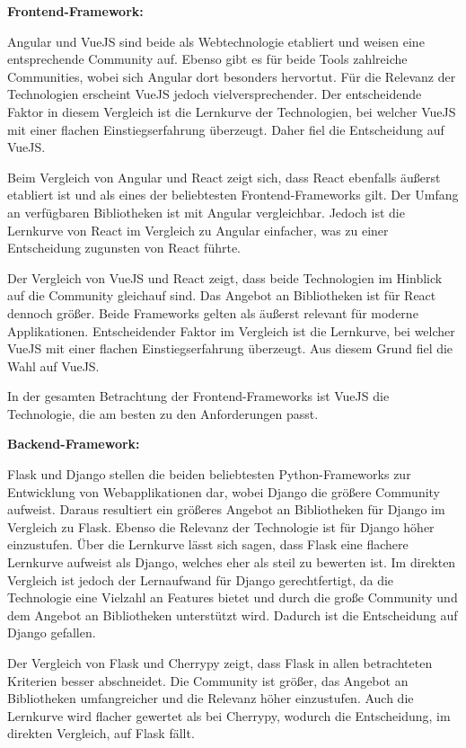 \textbf{Frontend-Framework:}

Angular und VueJS sind beide als Webtechnologie etabliert und weisen eine entsprechende Community auf.
Ebenso gibt es für beide Tools zahlreiche Communities, wobei sich Angular dort besonders hervortut.
Für die Relevanz der Technologien erscheint VueJS jedoch vielversprechender.
Der entscheidende Faktor in diesem Vergleich ist die Lernkurve der Technologien, bei welcher VueJS mit einer flachen Einstiegserfahrung überzeugt.
Daher fiel die Entscheidung auf VueJS.

Beim Vergleich von Angular und React zeigt sich, dass React ebenfalls äußerst etabliert ist und als eines der beliebtesten Frontend-Frameworks gilt.
Der Umfang an verfügbaren Bibliotheken ist mit Angular vergleichbar.
Jedoch ist die Lernkurve von React im Vergleich zu Angular einfacher, was zu einer Entscheidung zugunsten von React führte.

Der Vergleich von VueJS und React zeigt, dass beide Technologien im Hinblick auf die Community gleichauf sind.
Das Angebot an Bibliotheken ist für React dennoch größer.
Beide Frameworks gelten als äußerst relevant für moderne Applikationen.
Entscheidender Faktor im Vergleich ist die Lernkurve, bei welcher VueJS mit einer flachen Einstiegserfahrung überzeugt.
Aus diesem Grund fiel die Wahl auf VueJS.

In der gesamten Betrachtung der Frontend-Frameworks ist VueJS die Technologie, die am besten zu den Anforderungen passt.

\textbf{Backend-Framework:}

Flask und Django stellen die beiden beliebtesten Python-Frameworks zur Entwicklung von Webapplikationen dar, wobei Django die größere Community aufweist.
Daraus resultiert ein größeres Angebot an Bibliotheken für Django im Vergleich zu Flask.
Ebenso die Relevanz der Technologie ist für Django höher einzustufen.
Über die Lernkurve lässt sich sagen, dass Flask eine flachere Lernkurve aufweist als Django, welches eher als steil zu bewerten ist.
Im direkten Vergleich ist jedoch der Lernaufwand für Django gerechtfertigt, da die Technologie eine Vielzahl an Features bietet und durch die große Community und dem Angebot an Bibliotheken unterstützt wird.
Dadurch ist die Entscheidung auf Django gefallen.

Der Vergleich von Flask und Cherrypy zeigt, dass Flask in allen betrachteten Kriterien besser abschneidet.
Die Community ist größer, das Angebot an Bibliotheken umfangreicher und die Relevanz höher einzustufen.
Auch die Lernkurve wird flacher gewertet als bei Cherrypy, wodurch die Entscheidung, im direkten Vergleich, auf Flask fällt.

